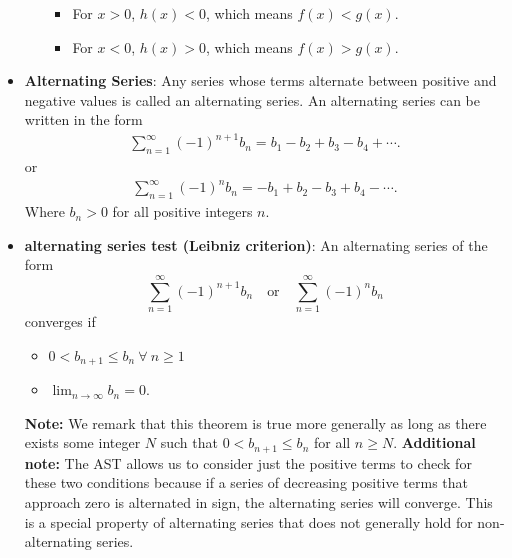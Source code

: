 \documentclass{report}
\begin{document}
\begin{itemize}
\begin{itemize}
            \begin{itemize}
                \item For $x > 0$, $h(x) < 0$, which means $f(x) < g(x)$.
                \item For $x < 0$, $h(x) > 0$, which means $f(x) > g(x)$.
            \end{itemize}
    \end{itemize}

\item \textbf{Alternating Series}:
    Any series whose terms alternate between positive and negative values is called an alternating series. An alternating series can be written in the form 
    \begin{align*}
        \sum_{n=1}^{\infty} (-1)^{n+1} b_n = b_1 - b_2 + b_3 - b_4 + \cdots
    .\end{align*}
    or
    \begin{align*}
        \sum_{n=1}^{\infty} (-1)^n b_n = -b_1 + b_2 - b_3 + b_4 - \cdots
    .\end{align*}
    Where  $b_n > 0$  for all positive integers $n$.
\item \textbf{alternating series test (Leibniz criterion)}:
    An alternating series of the form
    \[
        \sum_{n=1}^{\infty} (-1)^{n+1} b_n \quad \text{or} \quad \sum_{n=1}^{\infty} (-1)^n b_n
    \]
    converges if
    \begin{itemize}

        \item $0 < b_{n+1} \leq b_n\ \forall\ n \geq 1$
        \item $\lim_{n \to \infty} b_n = 0.$
    \end{itemize}
    \textbf{Note:} We remark that this theorem is true more generally as long as there exists some integer \( N \) such that \( 0 < b_{n+1} \leq b_n \) for all \( n \geq N \).
    \bigbreak \noindent 
    \textbf{Additional note:} The AST allows us to consider just the positive terms to check for these two conditions because if a series of decreasing positive terms that approach zero is alternated in sign, the alternating series will converge. This is a special property of alternating series that does not generally hold for non-alternating series.


\end{itemize}
\end{document}
